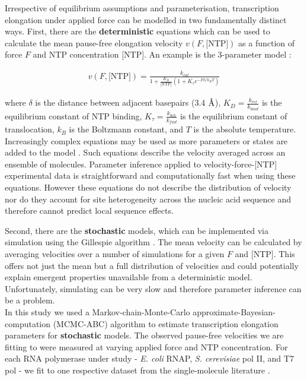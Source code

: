\documentclass[10pt,letterpaper]{article}
\newcommand{\angstrom}{\mbox{\normalfont\AA}}
\begin{document}
Irrespective of equilibrium assumptions and parameterisation, transcription elongation under applied force can be modelled in two fundamentally distinct ways. First, there are the \textbf{deterministic}  equations which can be used to calculate the mean pause-free elongation velocity $v(F, \text{[NTP]})$ as a function of force $F$ and NTP concentration [NTP]. An example is the 3-parameter model \cite{abbondanzieri2005direct}:


\begin{eqnarray}
\label{eq:deterministicBoltzmann}
v(F, \text{[NTP]}) = \frac{k_{cat}}{1 + \frac{K_D}{\text{[NTP]}}(1 + K_\tau  e^{-F \delta / k_B T})}
\end{eqnarray}



where $\delta$ is the distance between adjacent basepairs (3.4 $\angstrom$), $K_D = \frac{k_{rel}}{k_{bind}}$ is the equilibrium constant of NTP binding, $K_\tau = \frac{k_{bck}}{k_{fwd}}$ is the equilibrium constant of translocation, $k_B$ is the Boltzmann constant, and $T$ is the absolute temperature. Increasingly complex equations may be used as more parameters or states are added to the model \cite{abbondanzieri2005direct, maoileidigh2011unified, bai2007mechanochemical}. Such equations describe the velocity averaged across an ensemble of molecules. Parameter inference applied to velocity-force-[NTP] experimental data is straightforward and computationally fast when using these equations. However these equations do not describe the distribution of velocity nor do they account for site heterogeneity across the nucleic acid sequence and therefore cannot predict local sequence effects. \par


Second, there are the \textbf{stochastic} models, which can be implemented via simulation using the Gillespie algorithm \cite{gillespie1977exact}. The mean velocity can be calculated by averaging velocities over a number of simulations for a given $F$ and [NTP]. This offers not just the mean but a full distribution of velocities and could potentially explain emergent properties unavailable from a deterministic model. Unfortunately, simulating can be very slow and therefore parameter inference can be a problem. \\


In this study we used a Markov-chain-Monte-Carlo approximate-Bayesian-computation (MCMC-ABC) algorithm \cite{beaumont2010approximate} to estimate transcription elongation parameters for \textbf{stochastic} models. The observed pause-free velocities we are fitting to were measured at varying applied force and NTP concentration. For each RNA polymerase under study - {\it E. coli} RNAP, {\it S. cerevisiae} pol II, and T7 pol - we fit to one respective dataset from the single-molecule literature \cite{abbondanzieri2005direct,schweikhard2014transcription,thomen2008t7}. 
\end{document}
